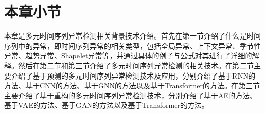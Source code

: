 \section{本章小节}
本章是多元时间序列异常检测相关背景技术介绍。首先在第一节介绍了什么是时间序列中的异常，即时间序列异常的相关类型，包括全局异常、上下文异常、季节性异常、趋势异常、Shapelet异常等，并通过具体的例子与公式对其进行了详细的解释。然后在第二节和第三节介绍了多元时间序列异常检测的相关技术。在第二节主要介绍了基于预测的多元时间序列异常检测技术及应用，分别介绍了基于RNN的方法、基于CNN的方法、基于GNN的方法以及基于Transformer的方法。在第三节主要介绍了基于重构的多元时间序列异常检测技术，分别介绍了基于AE的方法、基于VAE的方法、基于GAN的方法以及基于Transformer的方法。